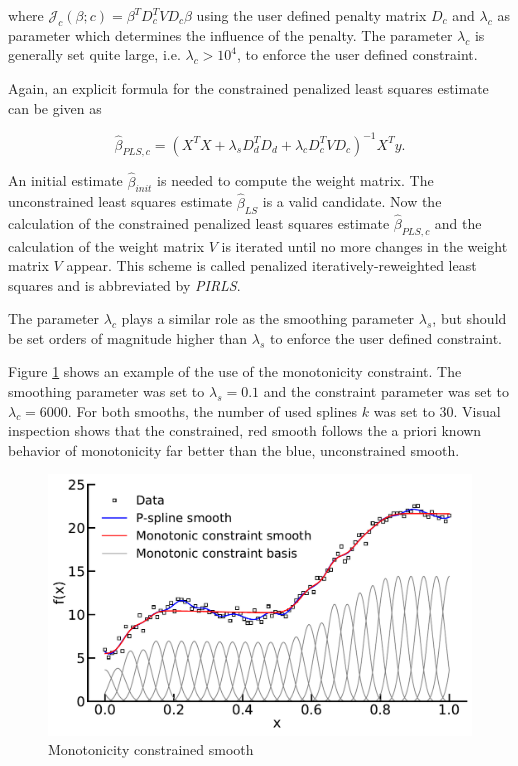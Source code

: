 \documentclass[10pt,a4paper]{article}
\begin{document}
	where $\mathcal J_c(\beta; c) = \beta^T D_c^T V D_c \beta$ using the user defined penalty matrix $D_c$ and $\lambda_c$ as parameter which determines the influence of the penalty. The parameter $\lambda_c$ is generally set quite large, i.e. $\lambda_c > 10^4$, to enforce the user defined constraint. 
	
	Again, an explicit formula for the constrained penalized least squares estimate can be given as
	
	$$\hat \beta_{PLS,c} = (X^TX + \lambda_s D_d^T D_d  + \lambda_c D_c^T V D_c)^{-1} X^T y.$$
	
	An initial estimate $\hat \beta_{init}$ is needed to compute the weight matrix. The unconstrained least squares estimate $\hat \beta_{LS}$ is a valid candidate. Now the calculation of the constrained penalized least squares estimate $\hat \beta_{PLS, c}$ and the calculation of the weight matrix $V$ is iterated until no more changes in the weight matrix $V$ appear. This scheme is called penalized iteratively-reweighted least squares and is abbreviated by \emph{PIRLS}. \cite{hofner2011monotonicity}
	
	The parameter $\lambda_c$ plays a similar role as the smoothing parameter $\lambda_s$, but should be set orders of magnitude higher than $\lambda_s$ to enforce the user defined constraint. 
	
	Figure \ref{fig:incspline} shows an example of the use of the monotonicity constraint. The smoothing parameter was set to $\lambda_s = 0.1$ and the constraint parameter was set to $\lambda_c = 6000$. For both smooths, the number of used splines $k$ was set to $30$. Visual inspection shows that the constrained, red smooth follows the a priori known behavior of monotonicity far better than the blue, unconstrained smooth.
	
	
	\begin{figure}[H]
	\centering
	\includegraphics[width=\linewidth]{../thesisplots/inc_spline.pdf}
	\caption{Monotonicity constrained smooth}
	\label{fig:incspline}
	\end{figure}		
\end{document}
